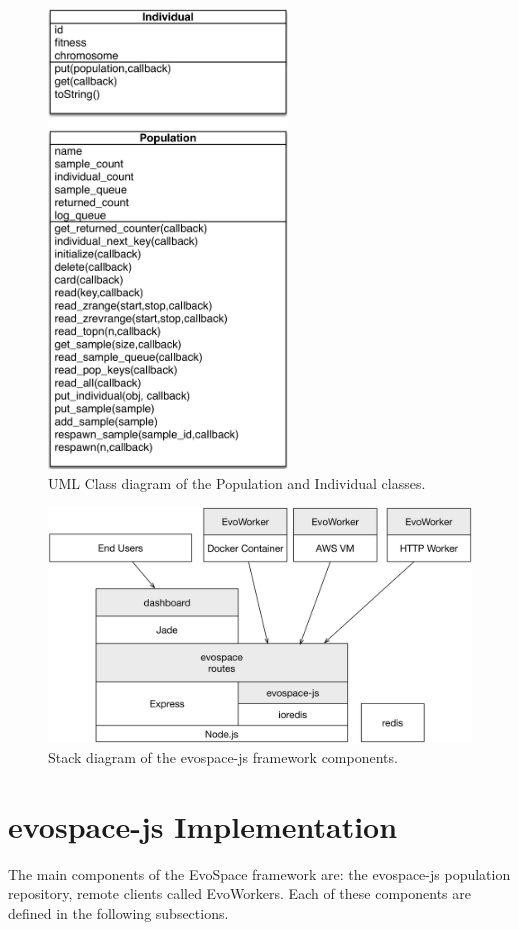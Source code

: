 \begin{figure}[!t]
    \centering
        \includegraphics[width=2.5in]{img/classes.png}
    \caption{ UML Class diagram of the Population and Individual classes.}
    \label{fig:classes}
\end{figure}
%
\begin{figure}[!t]
    \centering
        \includegraphics[width=5.4in]{img/evospace-js.png}
    \caption{ Stack diagram of the {\sf evospace-js} framework components.}
    \label{fig:stack}
\end{figure}

\section{{\sf evospace-js} Implementation}
\label{sec:evo}
The main components of the EvoSpace framework are: the {\sf evospace-js} 
population repository, remote clients called EvoWorkers.
Each of these components are defined in the following subsections.

